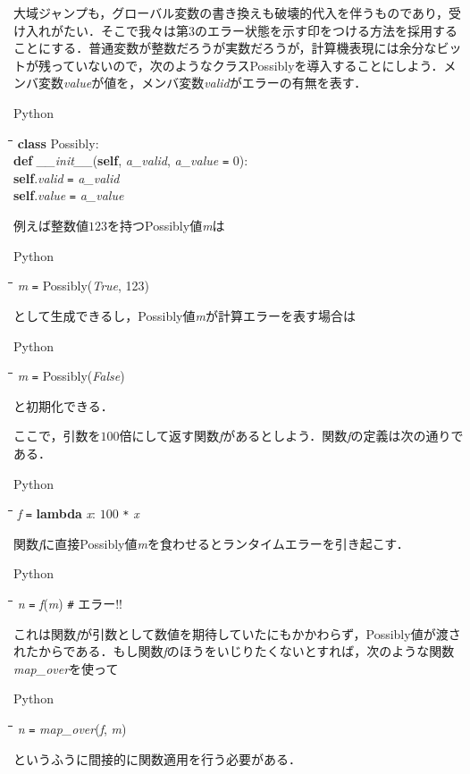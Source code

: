 \documentclass[twocolumn]{jsbook}
\newcommand{\programminglanguage}[1]{\textsf{#1}}
\newcommand{\python}{\programminglanguage{Python}}
\newenvironment{pythoncode}{\begin{itembox}[r]{\python}}{\end{itembox}}
\newenvironment{pythontab}{\begin{tabbing}\hspace*{1em}\=\hspace*{1em}\=\hspace*{1em}\=\hspace*{1em}\=\kill}{\end{tabbing}}
\newcommand{\pthnClassname}[1]{\textrm{#1}}
\newcommand{\pthnId}[1]{\textit{#1}}
\newcommand{\pthnKeyword}[1]{\textbf{#1}}
\newcommand{\pthnOp}[1]{\texttt{#1}}
\begin{document}
大域ジャンプも，グローバル変数の書き換えも破壊的代入を伴うものであり，受け入れがたい．そこで我々は第3のエラー状態を示す印をつける方法を採用することにする．普通変数が整数だろうが実数だろうが，計算機表現には余分なビットが残っていないので，次のようなクラス\pthnClassname{Possibly}を導入することにしよう．メンバ変数\pthnId{value}が値を，メンバ変数\pthnId{valid}がエラーの有無を表す．
\begin{pythoncode}
\begin{pythontab}
\pthnKeyword{class} \pthnClassname{Possibly}:\\
\>\pthnKeyword{def} \pthnId{\_\_init\_\_}(\pthnKeyword{self}, \pthnId{a\_valid}, \pthnId{a\_value} \pthnOp{=} $0$):\\
\>\>\pthnKeyword{self}.\pthnId{valid} \pthnOp{=} \pthnId{a\_valid}\\
\>\>\pthnKeyword{self}.\pthnId{value} \pthnOp{=} \pthnId{a\_value}
\end{pythontab}
\end{pythoncode}

例えば整数値$123$を持つPossibly値\pthnId{m}は
\begin{pythoncode}
\begin{pythontab}
\pthnId{m} \pthnOp{=} \pthnClassname{Possibly}(\pthnId{True}, 123)
\end{pythontab}
\end{pythoncode}
として生成できるし，\pthnClassname{Possibly}値\pthnId{m}が計算エラーを表す場合は
\begin{pythoncode}
\begin{pythontab}
\pthnId{m} \pthnOp{=} \pthnClassname{Possibly}(\pthnId{False})
\end{pythontab}
\end{pythoncode}
と初期化できる．

ここで，引数を$100$倍にして返す関数\pthnId{f}があるとしよう．関数\pthnId{f}の定義は次の通りである．
\begin{pythoncode}
\begin{pythontab}
\pthnId{f} \pthnOp{=} \pthnKeyword{lambda} \pthnId{x}: $100$ \pthnOp{*} \pthnId{x}
\end{pythontab}
\end{pythoncode}

関数\pthnId{f}に直接\pthnClassname{Possibly}値\pthnId{m}を食わせるとランタイムエラーを引き起こす．
\begin{pythoncode}
\begin{pythontab}
\pthnId{n} \pthnOp{=} \pthnId{f}(\pthnId{m}) \texttt{\#} エラー!!
\end{pythontab}
\end{pythoncode}
これは関数\pthnId{f}が引数として数値を期待していたにもかかわらず，\pthnClassname{Possibly}値が渡されたからである．もし関数\pthnId{f}のほうをいじりたくないとすれば，次のような関数\pthnId{map\_over}を使って
\begin{pythoncode}
\begin{pythontab}
\pthnId{n} \pthnOp{=} \pthnId{map\_over}(\pthnId{f}, \pthnId{m})
\end{pythontab}
\end{pythoncode}
というふうに間接的に関数適用を行う必要がある．
\end{document}
